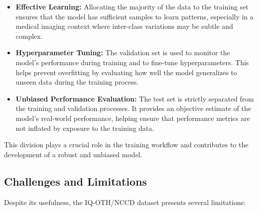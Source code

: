 \begin{itemize}
    \item \textbf{Effective Learning:} Allocating the majority of the data to the training set 
    ensures that the model has sufficient samples to learn patterns, especially in a medical imaging 
    context where inter-class variations may be subtle and complex.

    \item \textbf{Hyperparameter Tuning:} The validation set is used to monitor the model’s 
    performance during training and to fine-tune hyperparameters. This helps prevent overfitting by 
    evaluating how well the model generalizes to unseen data during the training process.

    \item \textbf{Unbiased Performance Evaluation:} The test set is strictly separated from the 
    training and validation processes. It provides an objective estimate of the model’s real-world 
    performance, helping ensure that performance metrics are not inflated by exposure to the 
    training data.
\end{itemize}

This division plays a crucial role in the training workflow and contributes to the development of a 
robust and unbiased model.


\subsection{Challenges and Limitations}

Despite its usefulness, the IQ-OTH/NCCD dataset presents several limitations:


